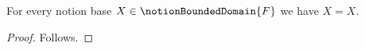 

\begin{proposition}\label{notion_bound_endpoint_needs_outer_evidence}
    For every notion base $X\in\notionBoundedDomain{F}$ we have $X=X$.
\end{proposition}
\begin{proof}
    Follows.
\end{proof}
